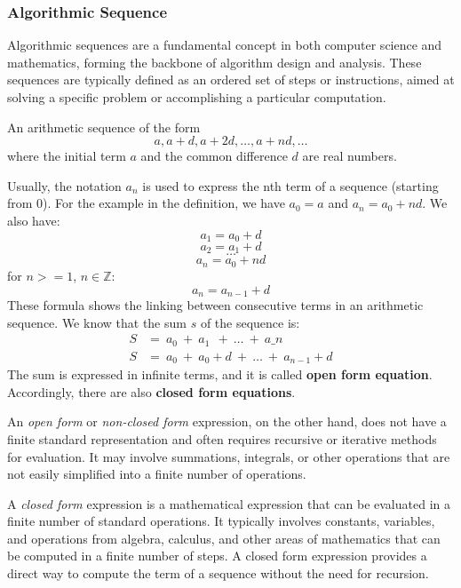 \documentclass[
	12pt, %
	fleqn, %
	a4paper, %
]{LegrandOrangeBook}
\begin{document}
\subsubsection{Algorithmic Sequence}
Algorithmic sequences are a fundamental concept in both computer science and mathematics, forming the backbone of algorithm design and analysis. These sequences are typically defined as an ordered set of steps or instructions, aimed at solving a specific problem or accomplishing a particular computation.
\begin{definition}
    An arithmetic sequence of the form
\[
a, a + d, a + 2d, \ldots, a + nd, \ldots
\]
where the initial term \( a \) and the common difference \( d \) are real numbers.
\end{definition}
Usually, the notation $a_n$ is used to express the nth term of a sequence (starting from 0). For the example in the 
definition, we have $a_0 = a$ and $a_n = a_0 + nd$. 
We also have:
$$a_1 = a_0 + d$$
$$a_2 = a_1 + d$$
$$\dots$$
$$a_n = a_0 + nd$$ 
for $n>=1$, $n\in \mathbb{Z}$:
$$a_n = a_{n-1} + d$$
These formula shows the linking between consecutive terms in an arithmetic sequence. We know that the sum
$s$ of the sequence is:
\begin{align*}
    S & =\ a_{0} \ +\ a_1\ \ +\ \dotsc \ +\ a\_n\\
    S & =\ a_{0} \ +\ a_{0} +d\ +\ \dotsc \ +\ a_{n-1} +d
    \end{align*}
The sum is expressed in infinite terms, and it is called \textbf{open form equation}. Accordingly, there are also \textbf{closed form
equations}.
\begin{definition}
    An \textit{open form} or \textit{non-closed form} expression, on the other hand, does not have a finite standard representation and often requires recursive or iterative methods for evaluation. It may involve summations, integrals, or other operations that are not easily simplified into a finite number of operations.
\end{definition}
\begin{definition}
    A \textit{closed form} expression is a mathematical expression that can be evaluated in a finite number of standard operations. It typically involves constants, variables, and operations from algebra, calculus, and other areas of mathematics that can be computed in a finite number of steps.
    A closed form expression provides a direct way to compute the term of a sequence without the need for recursion.
\end{definition}
\end{document}

